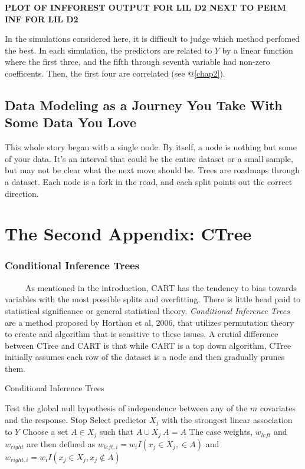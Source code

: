 \documentclass[12pt,twoside]{reedthesis}
\begin{document}
  \textbf{PLOT OF INFFOREST OUTPUT FOR LIL D2 NEXT TO PERM INF FOR LIL D2}
  
  In the simulations considered here, it is difficult to judge which
  method perfomed the best. In each simulation, the predictors are related
  to \(Y\) by a linear function where the first three, and the fifth
  through seventh variable had non-zero coefficents. Then, the first four
  are correlated (see @\ref{chap2}).
  
  \section{Data Modeling as a Journey You Take With Some Data You
  Love}\label{data-modeling-as-a-journey-you-take-with-some-data-you-love}
  
  This whole story began with a single node. By itself, a node is nothing
  but some of your data. It's an interval that could be the entire dataset
  or a small sample, but may not be clear what the next move should be.
  Trees are roadmaps through a dataset. Each node is a fork in the road,
  and each split points out the correct direction.
  
  \chapter{The Second Appendix: CTree}\label{the-second-appendix-ctree}
  
  \subsection{Conditional Inference
  Trees}\label{conditional-inference-trees}
  
  ~~~~~As mentioned in the introduction, CART has the tendency to bias
  towards variables with the most possible splits and overfitting. There
  is little head paid to statistical significance or general statistical
  theory. \emph{Conditional Inference Trees} are a method proposed by
  Horthon et al, 2006, that utilizes permutation theory to create and
  algorithm that is sensitive to these issues. A crutial difference
  between CTree and CART is that while CART is a top down algorithm, CTree
  initially assumes each row of the dataset is a node and then gradually
  prunes them.
  
  \begin{algorithm}
  \caption{Conditional Inference Trees}
  \label{ctree}
  \begin{algorithmic}[1]
  \State Test the global null hypothesis of independence between any of the $m$ covariates and the response. 
  \State Stop 
  \Else \State Select predictor $X_j$ with the strongest linear association to $Y$ 
  \EndIf
  \State Choose a set $A \in X_j$ such that $A \cup X_j \ A = A$ 
  \State The case weights, $w_{left}$ and $w_{right}$ are then defined as $w_{left,i} = w_i I (x_j \in X_j, \in A)$ and $w_{right,i} = w_i I(x_j \in X_j, x_j \notin A)$
  \EndFor
  \end{algorithmic}
  \end{algorithm}
  
\end{document}
